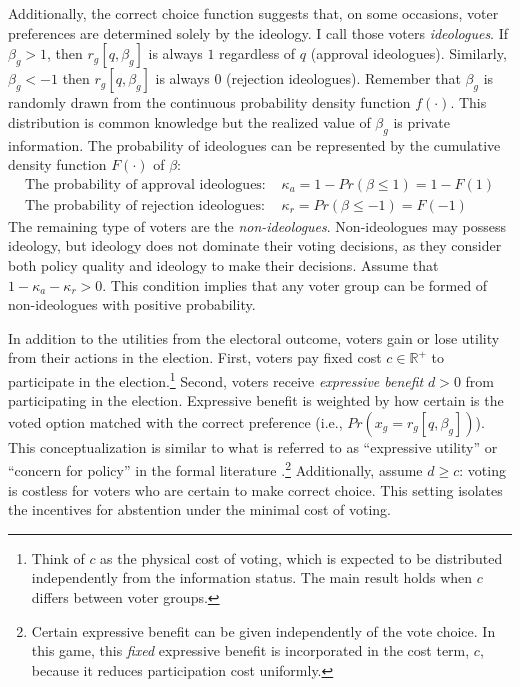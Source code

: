 \documentclass[letterpaper, 12pt]{article}
\begin{document}
    \par Additionally, the correct choice function suggests that, on some occasions, voter preferences are determined solely by the ideology. I call those voters \textit{ideologues}. If $\beta_g > 1$, then $r_g[q, \beta_g]$ is always $1$ regardless of $q$ (approval ideologues). Similarly, $\beta_g < -1$ then $r_g[q, \beta_g]$ is always $0$ (rejection ideologues). Remember that $\beta_g$ is randomly drawn from the continuous probability density function $f(\cdot)$. This distribution is common knowledge but the realized value of $\beta_g$ is private information. The probability of ideologues can be represented by the cumulative density function $F(\cdot)$ of $\beta$:
    \begin{align}
    \text{The probability of approval ideologues: } &\kappa_{a} = 1 - Pr(\beta \leq 1) = 1 - F(1)   \\
    \text{The probability of rejection ideologues: } &\kappa_{r} = Pr(\beta \leq -1) = F(-1)   
    \end{align}
    \noindent The remaining type of voters are the \textit{non-ideologues}. Non-ideologues may possess ideology, but ideology does not dominate their voting decisions, as they consider both policy quality and ideology to make their decisions. Assume that $1-\kappa_{a} - \kappa_{r} >0$. This condition implies that any voter group can be formed of non-ideologues with positive probability.
    
    \par In addition to the utilities from the electoral outcome, voters gain or lose utility from their actions in the election.  First, voters pay fixed cost $c \in \mathbb{R}^+$ to participate in the election.\footnote{Think of $c$ as the physical cost of voting, which is expected to be distributed independently from the information status. The main result holds when $c$ differs between voter groups.} Second, voters receive \textit{expressive benefit} $d > 0$ from participating in the election. Expressive benefit is weighted by how certain is the voted option matched with the correct preference (i.e., $Pr(x_g=r_g[q, \beta_g])$). 
    This conceptualization is similar to what is referred to as ``expressive utility'' or ``concern for policy'' in the formal literature \citep{Dewan2008thqu, Little2015pran}.\footnote{Certain expressive benefit can be given independently of the vote choice. In this game, this \textit{fixed} expressive benefit is incorporated in the cost term, $c$, because it reduces participation cost uniformly.} Additionally, assume $d \geq c$: voting is costless for voters who are certain to make correct choice. This setting isolates the incentives for abstention under the minimal cost of voting.
    
\end{document}
